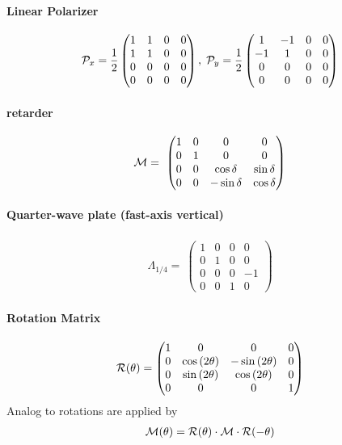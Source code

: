 \paragraph{Linear Polarizer}
\begin{align}
\mathcal{P}_x=\frac{1}{2}
\begin{pmatrix}
    1 & 1 & 0 & 0 \\
    1 & 1 & 0 & 0 \\
    0 & 0 & 0 & 0 \\
    0 & 0 & 0 & 0
  \end{pmatrix}
, \;
\mathcal{P}_y=\frac{1}{2}
\begin{pmatrix}
     1 & -1 & 0 & 0 \\
    -1 &  1 & 0 & 0 \\
     0 &  0 & 0 & 0 \\
     0 &  0 & 0 & 0
\end{pmatrix}
\end{align}
% 
\paragraph{retarder}
\begin{align}
\mathcal{M}=\
\begin{pmatrix}
    1 & 0 & 0 &  0 \\
    0 & 1 & 0 &  0 \\
    0 & 0 & \cos \delta & \sin \delta \\
    0 & 0 & -\sin \delta &  \cos \delta
\end{pmatrix}
\end{align}
% 
\paragraph{Quarter-wave plate (fast-axis vertical)}
\begin{align}
\Lambda_{1/4}=\
\begin{pmatrix}
    1 & 0 & 0 &  0 \\
    0 & 1 & 0 &  0 \\
    0 & 0 & 0 & -1 \\
    0 & 0 & 1 &  0
\end{pmatrix}
\end{align}
% 
\paragraph{Rotation Matrix}
\begin{align}
\mathcal{R}(\theta)=
\begin{split}
\begin{pmatrix}
    1 &                0 &               0 & 0 \\
    0 & \cos{(2\theta)} & -\sin{(2\theta)} & 0 \\
    0 & \sin{(2\theta)} & \cos{(2\theta)} & 0 \\
    0 &                0 &               0 & 1
  \end{pmatrix}
\end{split}
\end{align}
% 
Analog to \dummy{} rotations are applied by
\begin{align}
\mathcal{M}(\theta )=\mathcal{R}(\theta )\cdot\mathcal{M}\cdot\mathcal{R}(-\theta )
\end{align}
% 
% 
% 
